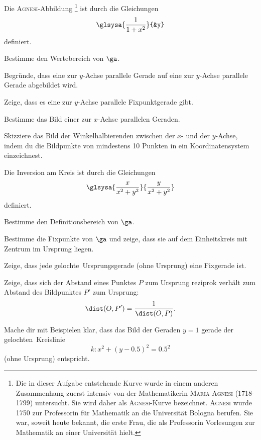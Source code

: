 \documentclass[%
11pt,%
twoside,%
titlepage,%
german,%
headsepline%
]{scrartcl}
\begin{document}
\begin{ueb}
Die \textsc{Agnesi}-Abbildung
\footnote{
Die in dieser Aufgabe entstehende Kurve wurde in einem anderen Zusammenhang zuerst intensiv von der Mathematikerin \textsc{Maria Agnesi} (1718-1799) untersucht. Sie wird daher als \textsc{Agnesi}-Kurve bezeichnet. \textsc{Agnesi} wurde 1750 zur Professorin für Mathematik an die Universität Bologna berufen. Sie war, soweit heute bekannt, die erste Frau, die als Professorin Vorlesungen zur Mathematik an einer Universität hielt.
}
ist durch die Gleichungen
$$\glsysa{\frac{1}{1+x^2}}{&y}$$
definiert.
\begin{enumeratea}
\item Bestimme den Wertebereich von $\ga$.
\item Begr\"unde, dass eine zur $y$-Achse parallele Gerade auf eine zur $y$-Achse parallele Gerade abgebildet wird.
\item Zeige, dass es eine zur $y$-Achse parallele Fixpunktgerade gibt.
\item Bestimme das Bild einer zur $x$-Achse parallelen Geraden.
\item Skizziere das Bild der Winkelhalbierenden zwischen der $x$- und der $y$-Achse, indem du die Bildpunkte von mindestens 10 Punkten in ein Koordinatensystem einzeichnest.
\end{enumeratea}
\end{ueb}

\begin{ueb}
Die Inversion am Kreis ist durch die Gleichungen
$$\glsysa{\frac{x}{x^2+y^2}}{\frac{y}{x^2+y^2}}$$
definiert.
\begin{enumeratea}
\item Bestimme den Definitionsbereich von $\ga$.
\item Bestimme die Fixpunkte von $\ga$ und zeige, dass sie auf dem Einheitskreis mit Zentrum im Ursprung liegen.
\item Zeige, dass jede \glqq gelochte\grqq\ Ursprungsgerade (ohne Ursprung) eine Fixgerade ist.
\item Zeige, dass sich der Abstand eines Punktes $P$ zum Ursprung reziprok verhält zum Abstand des Bildpunktes $P'$ zum Ursprung:
$$\dist(O,P')=\frac{1}{\dist(O,P)}.$$
\item Mache dir mit Beispielen klar, dass das Bild der Geraden $y = 1$ gerade der \glqq gelochten\grqq\ Kreislinie
$$k : x^2 + (y-0.5)^2 = 0.5^2$$
(ohne Ursprung) entspricht.
\end{enumeratea}
\end{ueb}
\end{document}
